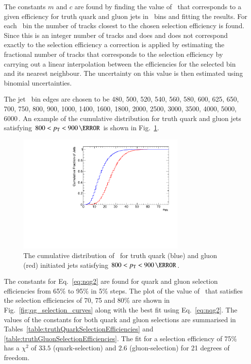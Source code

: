 The constants $m$ and $c$ are found by finding the value of \ntrk\ 
that corresponds to a given efficiency for truth quark and gluon jets in 
\pT\ bins and fitting the results. For each \pT\ bin the number of tracks 
closest to the chosen selection efficiency is found. Since this is an integer 
number of tracks and does and does not correspond exactly to the selection efficiency 
a correction is applied by estimating the fractional number of tracks that corresponds 
to the selection  efficiency  by carrying out a linear interpolation between the efficiencies 
for the selected bin and its nearest neighbour. The uncertainty on this value is then estimated using 
binomial uncertainties. 


The jet \pT\ bin edges are chosen to be 
480, 500, 520, 540, 560, 580, 600, 625, 650, 700, 750, 800, 900, 1000, 1400, 
1600, 1800, 2000, 2500, 3000, 3500, 4000, 5000, 6000\,\GeV. An example of the \ntrk cumulative 
distribution for truth quark and gluon jets satisfying $800 < \pT < 900\,\GeV$ is shown in
Fig.~\ref{fig:ntrk_cumulative}.


\begin{figure}[htb]
 \centering
\includegraphics[width=0.75\textwidth]{figures/tagging/Cumulative_ntrk_distribution_12_800_900GeV.pdf}
\caption{The cumulative distribution of \ntrk\ for truth quark (blue) and gluon (red) initiated jets 
satisfying $800 < \pT < 900\,\GeV$.  \label{fig:ntrk_cumulative}}
\end{figure}


The constants for Eq.~\ref{eq:nqg2} are found for quark and gluon selection efficiencies from 
65\% to 95\% in 5\% steps. The plot of the value of \ntrk\ that satisfies the selection efficiencies 
of 70, 75 and 80\% are shown in Fig.~\ref{fig:qg_selection_curves} along with the best fit using Eq.~\ref{eq:nqg2}.
The values of the constants for both quark and gluon selections are summarised in 
Tables~\ref{table:truthQuarkSelectionEfficiencies} and \ref{table:truthGluonSelectionEfficiencies}. 
The fit for a selection efficiency of 75\% has a $\chi^2$ of $33.5$ (quark-selection) and $2.6$ 
(gluon-selection) for 21 degrees of freedom. 

